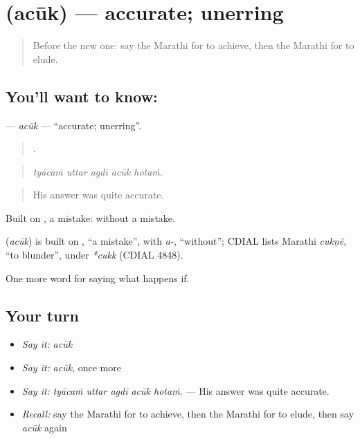 \section[\texorpdfstring{\mr{अचूक} (acūk)}{अचूक (acūk)}]{ (acūk) — accurate; unerring}

\label{lesson:MR-C553-acuk}



\begin{quote}
Before the new one: say the Marathi for to achieve, then the Marathi for to elude.
\end{quote}

\subsection*{You'll want to know: }
\textbf{} — \emph{acūk} — \textquotedblleft{}accurate; unerring\textquotedblright{}.

\begin{quote}
    .
\end{quote}

\begin{quote}
\emph{tyācaṁ uttar agdī acūk hotaṁ.}
\end{quote}

\begin{quote}
His answer was quite accurate.
\end{quote}

Built on , a mistake: without a mistake.

\begin{cousinweb}
\textbf{} (\emph{acūk}) is built on , \textquotedblleft{}a mistake\textquotedblright{}, with \emph{a-}, \textquotedblleft{}without\textquotedblright{}; CDIAL lists Marathi \emph{cukṇẽ}, \textquotedblleft{}to blunder\textquotedblright{}, under \emph{*cukk} (CDIAL 4848).
\end{cousinweb}

\begin{grammarlens}[title={What you've built}]
One more word for saying what happens if.
\end{grammarlens}

\subsection*{Your turn}
\begin{itemize}
\raggedright
  \item \emph{Say it:} \emph{acūk}
  \item \emph{Say it:} \emph{acūk}, once more
  \item \emph{Say it:} \emph{tyācaṁ uttar agdī acūk hotaṁ.} — His answer was quite accurate.
  \item \emph{Recall:} say the Marathi for to achieve, then the Marathi for to elude, then say \emph{acūk} again
\end{itemize}

